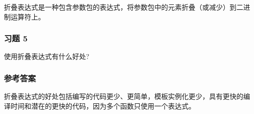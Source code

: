 折叠表达式是一种包含参数包的表达式，将参数包中的元素折叠（或减少）到二进制运算符上。

\subsubsection{习题 5}

使用折叠表达式有什么好处?

\subsubsection{参考答案}

折叠表达式的好处包括编写的代码更少、更简单，模板实例化更少，具有更快的编译时间和潜在的更快的代码，因为多个函数只使用一个表达式。












